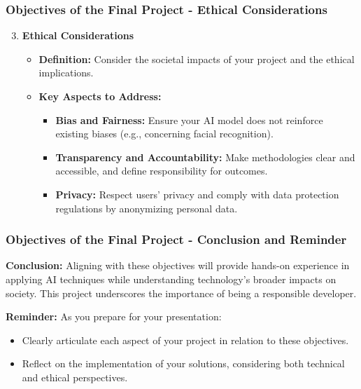 \documentclass[aspectratio=169]{beamer}
\begin{document}
\begin{frame}[fragile]
    \frametitle{Objectives of the Final Project - Ethical Considerations}
    
    \begin{enumerate}
        \setcounter{enumi}{2}
        \item \textbf{Ethical Considerations}
            \begin{itemize}
                \item \textbf{Definition:} Consider the societal impacts of your project and the ethical implications.
                \item \textbf{Key Aspects to Address:}
                    \begin{itemize}
                        \item \textbf{Bias and Fairness:} Ensure your AI model does not reinforce existing biases (e.g., concerning facial recognition).
                        \item \textbf{Transparency and Accountability:} Make methodologies clear and accessible, and define responsibility for outcomes.
                        \item \textbf{Privacy:} Respect users' privacy and comply with data protection regulations by anonymizing personal data.
                    \end{itemize}
            \end{itemize}
    \end{enumerate}
\end{frame}

\begin{frame}[fragile]
    \frametitle{Objectives of the Final Project - Conclusion and Reminder}
    
    \textbf{Conclusion:} Aligning with these objectives will provide hands-on experience in applying AI techniques while understanding technology's broader impacts on society. 
    This project underscores the importance of being a responsible developer.

    \textbf{Reminder:} As you prepare for your presentation:
    \begin{itemize}
        \item Clearly articulate each aspect of your project in relation to these objectives.
        \item Reflect on the implementation of your solutions, considering both technical and ethical perspectives.
    \end{itemize}
\end{frame}
\end{document}
